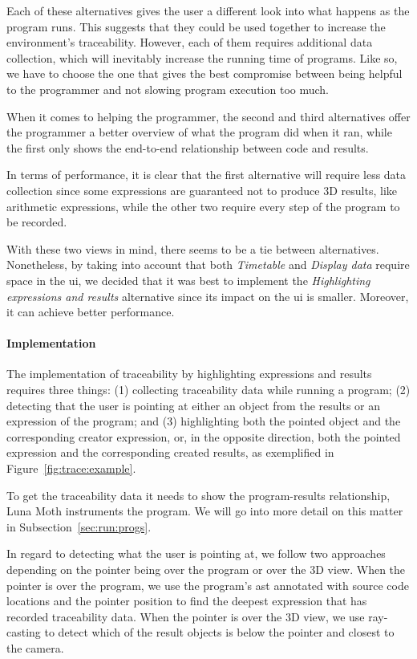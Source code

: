 Each of these alternatives gives the user a different look into what happens as the program runs.
This suggests that they could be used together to increase the environment's traceability.
However, each of them requires additional data collection, which will inevitably increase the running time of programs.
Like so, we have to choose the one that gives the best compromise between being helpful to the programmer and not slowing program execution too much.

When it comes to helping the programmer, the second and third alternatives offer the programmer a better overview of what the program did when it ran, while the first only shows the end-to-end relationship between code and results.

In terms of performance, it is clear that the first alternative will require less data collection since some expressions are guaranteed not to produce 3D results, like arithmetic expressions, while the other two require every step of the program to be recorded.

With these two views in mind, there seems to be a tie between alternatives.
Nonetheless, by taking into account that both {\it Timetable} and {\it Display data} require space in the \gls{ui}, we decided that it was best to implement the {\it Highlighting expressions and results} alternative since its impact on the \gls{ui} is smaller.
Moreover, it can achieve better performance.

\paragraph{Implementation}
The implementation of traceability by highlighting expressions and results requires three things:
(1) collecting traceability data while running a program;
(2) detecting that the user is pointing at either an object from the results or an expression of the program;
and (3) highlighting both the pointed object and the corresponding creator expression, or, in the opposite direction, both the pointed expression and the corresponding created results, as exemplified in Figure~\ref{fig:trace:example}.

To get the traceability data it needs to show the program-results relationship, Luna Moth instruments the program.
We will go into more detail on this matter in Subsection~\ref{sec:run:progs}.

In regard to detecting what the user is pointing at, we follow two approaches depending on the pointer being over the program or over the 3D view.
When the pointer is over the program, we use the program's \gls{ast} annotated with source code locations and the pointer position to find the deepest expression that has recorded traceability data.
When the pointer is over the 3D view, we use ray-casting to detect which of the result objects is below the pointer and closest to the camera.


